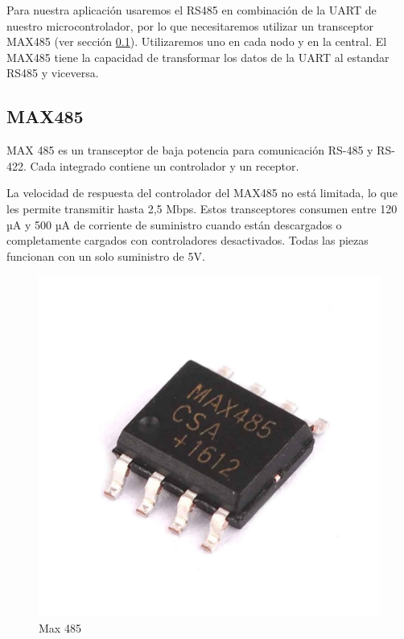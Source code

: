 Para nuestra aplicación usaremos el RS485 en combinación de la UART de nuestro microcontrolador, por lo que necesitaremos utilizar un transceptor MAX485 
(ver sección \ref{cap:max485}). Utilizaremos uno en cada nodo y en la central. El MAX485 tiene la capacidad de transformar los datos de la UART al estandar
RS485 y viceversa. \par

\subsection{MAX485} \label{cap:max485}

MAX 485 es un transceptor de baja potencia para comunicación RS-485 y RS-422. Cada integrado contiene un controlador y un receptor.\par 
La velocidad de respuesta del controlador del MAX485 no está limitada, lo que les permite transmitir hasta 2,5 Mbps. Estos transceptores
consumen entre 120 µA y 500 µA de corriente de suministro cuando están descargados o completamente cargados con controladores desactivados.
Todas las piezas funcionan con un solo suministro de 5V. 

\begin{figure}[htb]
	\centering
	\includegraphics[scale=0.5]{images/max485.jpg}
    \caption{Max 485}
	\label{fig:max485}
\end{figure}

